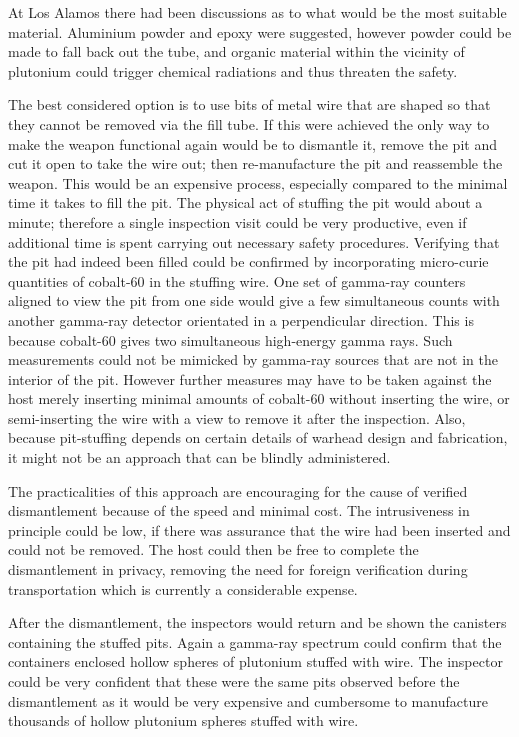\documentclass[twoside,titlepage,11pt,twocolumn,a4paper]{article}
\begin{document}
At Los Alamos there had been discussions as to what would be the most
suitable material. Aluminium powder and epoxy were suggested, however
powder could be made to fall back out the tube, and organic material
within the vicinity of plutonium could trigger chemical radiations and
thus threaten the safety.

The best considered option is to use bits of metal wire that are
shaped so that they cannot be removed via the fill tube.  If this were
achieved the only way to make the weapon functional again would be to
dismantle it, remove the pit and cut it open to take the wire out;
then re-manufacture the pit and reassemble the weapon. This would be
an expensive process, especially compared to the minimal time it takes
to fill the pit.  The physical act of stuffing the pit would about a
minute; therefore a single inspection visit could be very productive,
even if additional time is spent carrying out necessary safety
procedures.  Verifying that the pit had indeed been filled could be
confirmed by incorporating micro-curie quantities of cobalt-60 in the
stuffing wire. One set of gamma-ray counters aligned to view the pit
from one side would give a few simultaneous counts with another
gamma-ray detector orientated in a perpendicular direction.  This is
because cobalt-60 gives two simultaneous high-energy gamma rays. Such
measurements could not be mimicked by gamma-ray sources that are not
in the interior of the pit. \citep{zarimpas2003} However further 
measures may have to be taken against the host
merely inserting minimal amounts of cobalt-60 without inserting the
wire, or semi-inserting the wire with a view to remove it after the
inspection. Also, because pit-stuffing depends on certain details of
warhead design and fabrication, it might not be an approach that can
be blindly administered.

The practicalities of this approach are encouraging for the cause of
verified dismantlement because of the speed and minimal cost. The
intrusiveness in principle could be low, if there was assurance that
the wire had been inserted and could not be removed. The host could
then be free to complete the dismantlement in privacy, removing the
need for foreign verification during transportation which is currently
a considerable expense.

After the dismantlement, the inspectors would return and be shown the
canisters containing the stuffed pits. Again a gamma-ray spectrum
could confirm that the containers enclosed hollow spheres of plutonium
stuffed with wire. The inspector could be very confident that these
were the same pits observed before the dismantlement as it would be
very expensive and cumbersome to manufacture thousands of hollow
plutonium spheres stuffed with wire.
\end{document}
